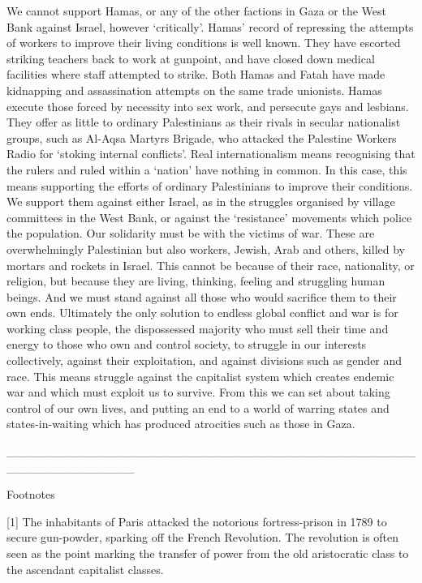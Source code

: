 We cannot support Hamas, or any of the other factions in Gaza or the West Bank
against Israel, however ‘critically’. Hamas’ record of repressing the attempts of workers
to improve their living conditions is well known. They have escorted striking teachers
back to work at gunpoint, and have closed down medical facilities where staff attempted
to strike. Both Hamas and Fatah have made kidnapping and assassination attempts on
the same trade unionists. Hamas execute those forced by necessity into sex work, and
persecute gays and lesbians. They offer as little to ordinary Palestinians as their rivals in
secular nationalist groups, such as Al-Aqsa Martyrs Brigade, who attacked the Palestine
Workers Radio for ‘stoking internal conflicts’. Real internationalism means recognising
that the rulers and ruled within a ‘nation’ have nothing in common. In this case, this
means supporting the efforts of ordinary Palestinians to improve their conditions. We
support them against either Israel, as in the struggles organised by village committees in
the West Bank, or against the ‘resistance’ movements which police the population.
Our solidarity must be with the victims of war. These are overwhelmingly Palestinian
but also workers, Jewish, Arab and others, killed by mortars and rockets in Israel.
This cannot be because of their race, nationality, or religion, but because they are living,
thinking, feeling and struggling human beings. And we must stand against all those who
would sacrifice them to their own ends. Ultimately the only solution to endless global
conflict and war is for working class people, the dispossessed majority who must sell
their time and energy to those who own and control society, to struggle in our interests
collectively, against their exploitation, and against divisions such as gender and race.
This means struggle against the capitalist system which creates endemic war and which
must exploit us to survive. From this we can set about taking control of our own lives,
and putting an end to a world of warring states and states-in-waiting which has produced
atrocities such as those in Gaza.

_______________________________________________________________

Footnotes

[1] The inhabitants of Paris attacked the notorious fortress-prison in 1789 to secure gun-powder, sparking off the French Revolution. The revolution is often seen as the point marking the transfer of power from the old aristocratic class to the ascendant capitalist classes.

